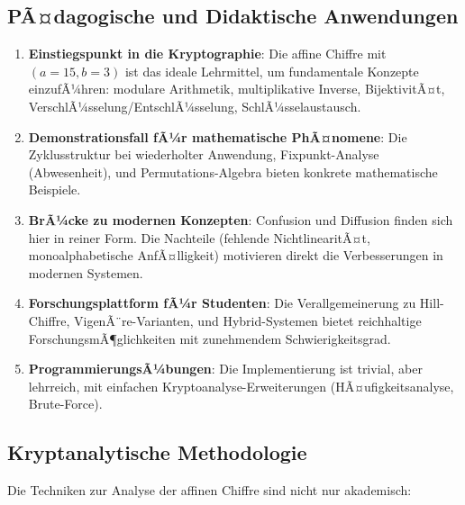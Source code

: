 ﻿\documentclass[12pt,a4paper]{article}
\begin{document}
	\subsection{PÃ¤dagogische und Didaktische Anwendungen}
	
	\begin{enumerate}
		\item \textbf{Einstiegspunkt in die Kryptographie}: Die affine Chiffre mit $(a=15, b=3)$ ist das ideale Lehrmittel, um fundamentale Konzepte einzufÃ¼hren: modulare Arithmetik, multiplikative Inverse, BijektivitÃ¤t, VerschlÃ¼sselung/EntschlÃ¼sselung, SchlÃ¼sselaustausch.
		
		\item \textbf{Demonstrationsfall fÃ¼r mathematische PhÃ¤nomene}: Die Zyklusstruktur bei wiederholter Anwendung, Fixpunkt-Analyse (Abwesenheit), und Permutations-Algebra bieten konkrete mathematische Beispiele.
		
		\item \textbf{BrÃ¼cke zu modernen Konzepten}: Confusion und Diffusion finden sich hier in reiner Form. Die Nachteile (fehlende NichtlinearitÃ¤t, monoalphabetische AnfÃ¤lligkeit) motivieren direkt die Verbesserungen in modernen Systemen.
		
		\item \textbf{Forschungsplattform fÃ¼r Studenten}: Die Verallgemeinerung zu Hill-Chiffre, VigenÃ¨re-Varianten, und Hybrid-Systemen bietet reichhaltige ForschungsmÃ¶glichkeiten mit zunehmendem Schwierigkeitsgrad.
		
		\item \textbf{ProgrammierungsÃ¼bungen}: Die Implementierung ist trivial, aber lehrreich, mit einfachen Kryptoanalyse-Erweiterungen (HÃ¤ufigkeitsanalyse, Brute-Force).
	\end{enumerate}
	
	\subsection{Kryptanalytische Methodologie}
	
	Die Techniken zur Analyse der affinen Chiffre sind nicht nur akademisch:
	
\end{document}
